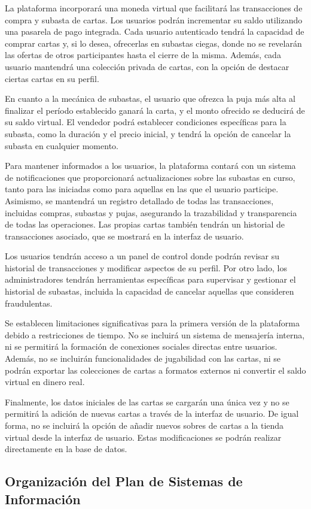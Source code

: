 La plataforma incorporará una moneda virtual que facilitará las transacciones de compra y subasta de cartas. Los usuarios podrán incrementar su saldo utilizando una pasarela de pago integrada. 
Cada usuario autenticado tendrá la capacidad de comprar cartas y, si lo desea, ofrecerlas en subastas ciegas, donde no se revelarán las ofertas de otros participantes hasta el cierre de la misma. 
Además, cada usuario mantendrá una colección privada de cartas, con la opción de destacar ciertas cartas en su perfil.

En cuanto a la mecánica de subastas, el usuario que ofrezca la puja más alta al finalizar el período establecido ganará la carta, y el monto ofrecido se deducirá de su saldo virtual. 
El vendedor podrá establecer condiciones específicas para la subasta, como la duración y el precio inicial, y tendrá la opción de cancelar la subasta en cualquier momento.

Para mantener informados a los usuarios, la plataforma contará con un sistema de notificaciones que proporcionará actualizaciones sobre las subastas en curso, tanto para las iniciadas 
como para aquellas en las que el usuario participe. Asimismo, se mantendrá un registro detallado de todas las transacciones, incluidas compras, subastas y pujas, asegurando la trazabilidad y 
transparencia de todas las operaciones. Las propias cartas también tendrán un historial de transacciones asociado, que se mostrará en la interfaz de usuario.

Los usuarios tendrán acceso a un panel de control donde podrán revisar su historial de transacciones y modificar aspectos de su perfil. 
Por otro lado, los administradores tendrán herramientas específicas para supervisar y gestionar el historial de subastas, incluida la capacidad de cancelar aquellas que consideren fraudulentas.

Se establecen limitaciones significativas para la primera versión de la plataforma debido a restricciones de tiempo.
No se incluirá un sistema de mensajería interna, ni se permitirá la formación de conexiones sociales directas entre usuarios. Además, no se incluirán funcionalidades de jugabilidad con las cartas, 
ni se podrán exportar las colecciones de cartas a formatos externos ni convertir el saldo virtual en dinero real.

Finalmente, los datos iniciales de las cartas se cargarán una única vez y no se permitirá la adición de nuevas cartas a través de la interfaz de usuario. De igual forma, no se incluirá la opción de
añadir nuevos sobres de cartas a la tienda virtual desde la interfaz de usuario. Estas modificaciones se podrán realizar directamente en la base de datos.


\subsection{Organización del Plan de Sistemas de Información }

